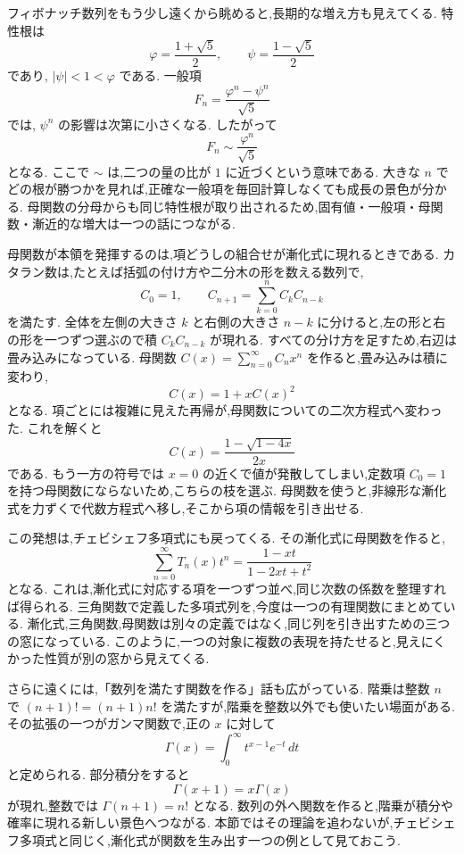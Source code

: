 フィボナッチ数列をもう少し遠くから眺めると,長期的な増え方も見えてくる.
特性根は
\[
  \varphi=\frac{1+\sqrt5}{2},
  \qquad
  \psi=\frac{1-\sqrt5}{2}
\]
であり,\,\,$|\psi|<1<\varphi$ である.
一般項
\[
  F_n=\frac{\varphi^n-\psi^n}{\sqrt5}
\]
では,\,\,$\psi^n$ の影響は次第に小さくなる.
したがって
\[
  F_n\sim\frac{\varphi^n}{\sqrt5}
\]
となる.
ここで $\sim$ は,二つの量の比が $1$ に近づくという意味である.
大きな $n$ でどの根が勝つかを見れば,正確な一般項を毎回計算しなくても成長の景色が分かる.
母関数の分母からも同じ特性根が取り出されるため,固有値・一般項・母関数・漸近的な増大は一つの話につながる.

母関数が本領を発揮するのは,項どうしの組合せが漸化式に現れるときである.
カタラン数は,たとえば括弧の付け方や二分木の形を数える数列で,
\[
  C_0=1,\qquad C_{n+1}=\sum_{k=0}^{n}C_kC_{n-k}
\]
を満たす.
全体を左側の大きさ $k$ と右側の大きさ $n-k$ に分けると,左の形と右の形を一つずつ選ぶので積 $C_kC_{n-k}$ が現れる.
すべての分け方を足すため,右辺は畳み込みになっている.
母関数 $C(x)=\sum_{n=0}^{\infty}C_nx^n$ を作ると,畳み込みは積に変わり,
\[
  C(x)=1+xC(x)^2
\]
となる.
項ごとには複雑に見えた再帰が,母関数についての二次方程式へ変わった.
これを解くと
\[
  C(x)=\frac{1-\sqrt{1-4x}}{2x}
\]
である.
もう一方の符号では $x=0$ の近くで値が発散してしまい,定数項 $C_0=1$ を持つ母関数にならないため,こちらの枝を選ぶ.
母関数を使うと,非線形な漸化式を力ずくで代数方程式へ移し,そこから項の情報を引き出せる.

この発想は,チェビシェフ多項式にも戻ってくる.
その漸化式に母関数を作ると,
\[
  \sum_{n=0}^{\infty}T_n(x)t^n
  =\frac{1-xt}{1-2xt+t^2}
\]
となる.
これは,漸化式に対応する項を一つずつ並べ,同じ次数の係数を整理すれば得られる.
三角関数で定義した多項式列を,今度は一つの有理関数にまとめている.
漸化式,三角関数,母関数は別々の定義ではなく,同じ列を引き出すための三つの窓になっている.
このように,一つの対象に複数の表現を持たせると,見えにくかった性質が別の窓から見えてくる.

さらに遠くには,「数列を満たす関数を作る」話も広がっている.
階乗は整数 $n$ で $(n+1)!=(n+1)n!$ を満たすが,階乗を整数以外でも使いたい場面がある.
その拡張の一つがガンマ関数で,正の $x$ に対して
\[
  \Gamma(x)=\int_0^\infty t^{x-1}e^{-t}\,dt
\]
と定められる.
部分積分をすると
\[
  \Gamma(x+1)=x\Gamma(x)
\]
が現れ,整数では $\Gamma(n+1)=n!$ となる.
数列の外へ関数を作ると,階乗が積分や確率に現れる新しい景色へつながる.
本節ではその理論を追わないが,チェビシェフ多項式と同じく,漸化式が関数を生み出す一つの例として見ておこう.

